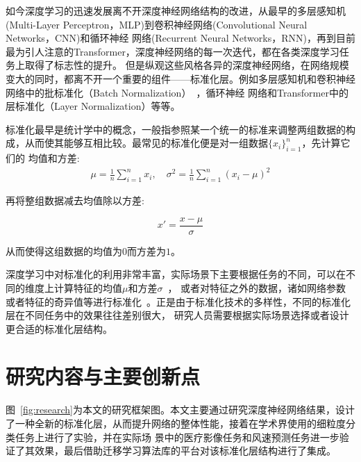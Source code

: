 如今深度学习的迅速发展离不开深度神经网络结构的改进，从最早的多层感知机(Multi-Layer Perceptron，MLP)到卷积神经网络(Convolutional Neural Networks，CNN)和循环神经
网络(Recurrent Neural Networks，RNN)，再到目前最为引人注意的Transformer，深度神经网络的每一次迭代，都在各类深度学习任务上取得了标志性的提升。
但是纵观这些风格各异的深度神经网络，在网络规模变大的同时，都离不开一个重要的组件——标准化层。例如多层感知机和卷积神经网络中的批标准化（Batch Normalization）~\citep{ioffe2015BN}，循环神经
网络和Transformer中的层标准化（Layer Normalization）\citep{lei2016LayerNorm}等等。

标准化最早是统计学中的概念，一般指参照某一个统一的标准来调整两组数据的构成，从而使其能够互相比较。最常见的标准化便是对一组数据${\{x_i\}}_{i=1}^n$，先计算它们的
均值和方差:
\begin{equation}
\begin{aligned}
    \mu=\frac{1}{n}\sum_{i=1}^n{x_i},\quad
    \sigma^2=\frac{1}{n}\sum_{i=1}^{n}{(x_i-\mu)^2}
\end{aligned}
\end{equation}

再将整组数据减去均值除以方差:

\begin{equation}
    x'=\frac{x-\mu}{\sigma}
\end{equation}

从而使得这组数据的均值为$0$而方差为$1$。

深度学习中对标准化的利用非常丰富，实际场景下主要根据任务的不同，可以在不同的维度上计算特征的均值$\mu$和方差$\sigma$~\citep{ioffe2015BN,lei2016LayerNorm,ulyanov_instance_2016,wu2018GroupNorm}，
或者对特征之外的数据，诸如网络参数或者特征的奇异值等进行标准化~\citep{Salimans2016Weight,miyato_spectral_2018}。正是由于标准化技术的多样性，不同的标准化层在不同任务中的效果往往差别很大，
研究人员需要根据实际场景选择或者设计更合适的标准化层结构。

\section{研究内容与主要创新点}

图~\ref{fig:research}为本文的研究框架图。本文主要通过研究深度神经网络结果，设计了一种全新的标准化层，从而提升网络的整体性能，接着在学术界使用的细粒度分类任务上进行了实验，并在实际场
景中的医疗影像任务和风速预测任务进一步验证了其效果，最后借助迁移学习算法库的平台对该标准化层结构进行了集成。

